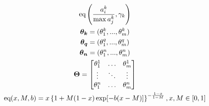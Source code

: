 \documentclass{article}
\begin{document}
\begin{gather}
    \text{eq}\left(
        \frac{
            a_{i}^{k}
        }{
            \max{a_{j}^{k}}
        },
        \gamma_{k}
    \right)\\
    \boldsymbol{\theta_{k}} = (\theta_{1}^{k}, ..., \theta_{m}^{k})\\
    \boldsymbol{\theta_{q}} = (\theta_{1}^{q}, ..., \theta_{m}^{q})\\
    \boldsymbol{\theta_{n}} = (\theta_{1}^{n}, ..., \theta_{m}^{n})\\
    \boldsymbol{\Theta} = 
    \begin{bmatrix}
        \theta_{1}^{1} & \hdots & \theta_{m}^{1}\\
        \vdots & \ddots & \vdots\\
        \theta_{1}^{n} & \hdots & \theta_{m}^{n}\\
    \end{bmatrix}\\
    \text{eq}(x,M,b) = 
    x\left\{
        1 + M (1 - x) \exp[-b(x - M)]
    \right\} ^ {
        -\frac{
            1 - x
        }{
            1 - M
        }
    }, x, M \in [0,1]\\

\end{gather}
\end{document}
